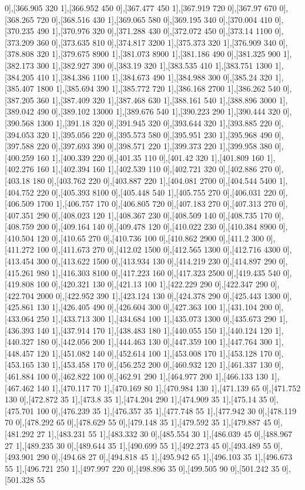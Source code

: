 {0],[366.905 320 1],[366.952 450 0],[367.477 450 1],[367.919 720 0],[367.97 670 0],[368.265 720 0],[368.516 430 1],[369.065 580 0],[369.195 340 0],[370.004 410 0],[370.235 490 1],[370.976 320 0],[371.288 430 0],[372.072 450 0],[373.14 1100 0],[373.209 360 0],[373.635 810 0],[374.817 3200 1],[375.373 320 1],[376.909 340 0],[378.808 320 1],[379.675 8900 1],[381.073 8900 1],[381.186 490 0],[381.325 900 1],[382.173 300 1],[382.927 390 0],[383.19 320 1],[383.535 410 1],[383.751 1300 1],[384.205 410 1],[384.386 1100 1],[384.673 490 1],[384.988 300 0],[385.24 320 1],[385.407 1800 1],[385.694 390 1],[385.772 720 1],[386.168 2700 1],[386.262 540 0],[387.205 360 1],[387.409 320 1],[387.468 630 1],[388.161 540 1],[388.896 3000 1],[389.042 490 0],[389.102 13000 1],[389.676 540 1],[390.223 290 1],[390.444 320 0],[390.568 1300 1],[391.18 320 0],[391.945 320 0],[393.644 320 1],[393.885 220 0],[394.053 320 1],[395.056 220 0],[395.573 580 0],[395.951 230 1],[395.968 490 0],[397.588 220 0],[397.693 390 0],[398.571 220 1],[399.373 220 1],[399.958 380 0],[400.259 160 1],[400.339 220 0],[401.35 110 0],[401.42 320 1],[401.809 160 1],[402.276 160 1],[402.394 160 1],[402.539 110 0],[402.721 320 0],[402.886 270 0],[403.18 180 0],[403.762 220 0],[403.887 220 1],[404.081 2700 0],[404.544 5400 1],[404.752 220 0],[405.393 8100 0],[405.448 540 1],[405.755 270 0],[406.031 220 0],[406.509 1700 1],[406.757 170 0],[406.805 720 0],[407.183 270 0],[407.313 270 0],[407.351 290 0],[408.023 120 1],[408.367 230 0],[408.509 140 0],[408.735 170 0],[408.759 200 0],[409.164 140 0],[409.478 120 0],[410.022 230 0],[410.384 8900 0],[410.504 120 0],[410.65 270 0],[410.736 100 0],[410.862 2900 0],[411.2 300 0],[411.272 100 0],[411.673 270 0],[412.02 1500 0],[412.565 1300 0],[412.716 4300 0],[413.454 300 0],[413.622 1500 0],[413.934 130 0],[414.219 230 0],[414.897 290 0],[415.261 980 1],[416.303 8100 0],[417.223 160 0],[417.323 2500 0],[419.435 540 0],[419.808 100 0],[420.321 130 0],[421.13 100 1],[422.229 290 0],[422.347 290 0],[422.704 2000 0],[422.952 390 1],[423.124 130 0],[424.378 290 0],[425.443 1300 0],[425.861 130 1],[426.405 490 0],[426.604 300 0],[427.363 100 1],[431.104 200 0],[433.064 250 1],[433.713 300 1],[434.684 100 1],[435.073 1300 0],[435.673 290 1],[436.393 140 1],[437.914 170 1],[438.483 180 1],[440.055 150 1],[440.124 120 1],[440.327 180 0],[442.056 200 1],[444.463 130 0],[447.359 100 1],[447.764 300 1],[448.457 120 1],[451.082 140 0],[452.614 100 1],[453.008 170 1],[453.128 170 0],[453.165 130 1],[453.458 170 0],[456.252 200 0],[460.932 120 1],[461.337 130 0],[461.884 100 0],[462.822 100 0],[462.91 290 1],[464.977 200 1],[466.133 130 1],[467.462 140 1],[470.117 70 1],[470.169 80 1],[470.984 130 1],[471.139 65 0],[471.752 130 0],[472.872 35 1],[473.8 35 1],[474.204 290 1],[474.909 35 1],[475.14 35 0],[475.701 100 0],[476.239 35 1],[476.357 35 1],[477.748 55 1],[477.942 30 0],[478.119 70 0],[478.292 65 0],[478.629 55 0],[479.148 35 1],[479.592 35 1],[479.887 45 0],[481.292 27 1],[483.231 55 1],[483.332 30 0],[485.554 30 1],[486.039 45 0],[488.967 27 1],[489.235 30 0],[489.644 35 1],[490.699 55 1],[492.273 45 0],[493.489 55 0],[493.901 290 0],[494.68 27 0],[494.818 45 1],[495.942 65 1],[496.103 35 1],[496.673 55 1],[496.721 250 1],[497.997 220 0],[498.896 35 0],[499.505 90 0],[501.242 35 0],[501.328 55 }

